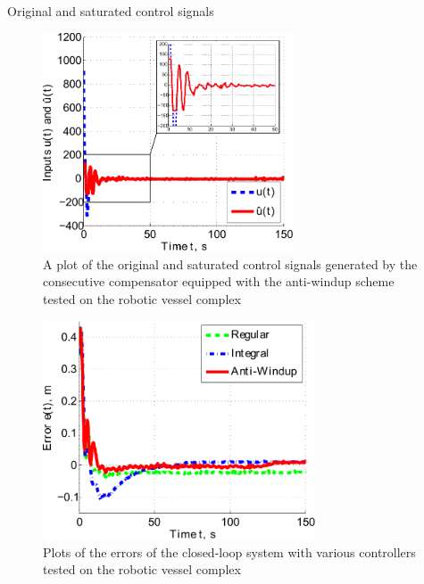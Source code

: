 \documentclass[10pt,pdf,hyperref={unicode}]{beamer}
\begin{document}
\begin{frame}{Original and saturated control signals}

\begin{figure}[t]
	\begin{center}
		\includegraphics[height=6.5cm]{experimental_approval_inputs}
			\centering \caption{A plot of the original and saturated control signals generated by the consecutive compensator equipped with the anti-windup scheme tested on the robotic vessel complex}
		\label{experimental_approval_inputs}
	\end{center}
\end{figure}

\end{frame}

\begin{frame}
\begin{figure}[t]
	\begin{center}
		\includegraphics[height=6.5cm]{experimental_approval_error}
		\caption{Plots of the errors of the closed-loop system with various controllers tested on the robotic vessel complex}
		\label{experimental_approval_error}
	\end{center}
\end{figure}

\end{frame}
\end{document}
